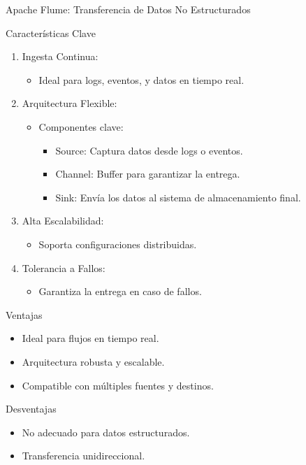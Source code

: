 \documentclass[presentation]{beamer}
\begin{document}
\begin{frame}[label={sec:org130638b}]{Apache Flume: Transferencia de Datos No Estructurados}
\begin{block}{Características Clave}
\begin{enumerate}
\item \alert{\alert{Ingesta Continua}}:
\begin{itemize}
\item Ideal para logs, eventos, y datos en tiempo real.
\end{itemize}
\item \alert{\alert{Arquitectura Flexible}}:
\begin{itemize}
\item Componentes clave:
\begin{itemize}
\item \alert{\alert{Source}}: Captura datos desde logs o eventos.
\item \alert{\alert{Channel}}: Buffer para garantizar la entrega.
\item \alert{\alert{Sink}}: Envía los datos al sistema de almacenamiento final.
\end{itemize}
\end{itemize}
\item \alert{\alert{Alta Escalabilidad}}:
\begin{itemize}
\item Soporta configuraciones distribuidas.
\end{itemize}
\item \alert{\alert{Tolerancia a Fallos}}:
\begin{itemize}
\item Garantiza la entrega en caso de fallos.
\end{itemize}
\end{enumerate}
\end{block}

\begin{block}{Ventajas}
\begin{itemize}
\item Ideal para flujos en tiempo real.
\item Arquitectura robusta y escalable.
\item Compatible con múltiples fuentes y destinos.
\end{itemize}
\end{block}

\begin{block}{Desventajas}
\begin{itemize}
\item No adecuado para datos estructurados.
\item Transferencia unidireccional.
\end{itemize}
\end{block}


\end{frame}
\end{document}
